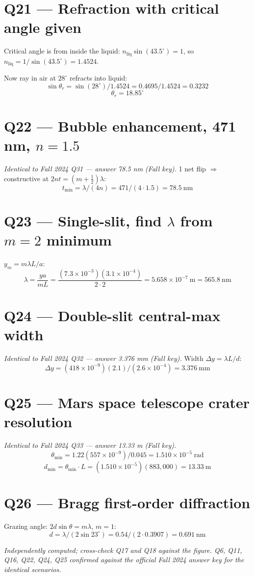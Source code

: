 \documentclass[11pt]{article}
\begin{document}
\section*{Q21 --- Refraction with critical angle given}
Critical angle is from inside the liquid: $n_{\text{liq}}\sin(43.5^\circ) = 1$, so $n_{\text{liq}} = 1/\sin(43.5^\circ) = 1.4524$.

Now ray in air at $28^\circ$ refracts into liquid:
\[ \sin\theta_r = \sin(28^\circ)/1.4524 = 0.4695/1.4524 = 0.3232 \]
\[ \theta_r = \boxed{18.85^\circ} \]

\section*{Q22 --- Bubble enhancement, 471 nm, $n=1.5$}
\emph{Identical to Fall 2024 Q31 --- answer 78.5 nm (Fall key).} 1 net flip $\Rightarrow$ constructive at $2nt=(m+\tfrac12)\lambda$:
\[ t_{\min} = \lambda/(4n) = 471/(4\cdot 1.5) = \boxed{78.5\ \text{nm}} \]

\section*{Q23 --- Single-slit, find $\lambda$ from $m=2$ minimum}
$y_m = m\lambda L/a$:
\[ \lambda = \frac{ya}{mL} = \frac{(7.3\times 10^{-3})(3.1\times 10^{-4})}{2\cdot 2} = 5.658\times 10^{-7}\ \text{m} = \boxed{565.8\ \text{nm}} \]

\section*{Q24 --- Double-slit central-max width}
\emph{Identical to Fall 2024 Q32 --- answer 3.376 mm (Fall key).} Width $\Delta y = \lambda L/d$:
\[ \Delta y = (418\times 10^{-9})(2.1)/(2.6\times 10^{-4}) = \boxed{3.376\ \text{mm}} \]

\section*{Q25 --- Mars space telescope crater resolution}
\emph{Identical to Fall 2024 Q33 --- answer 13.33 m (Fall key).}
\[ \theta_{\min} = 1.22(557\times 10^{-9})/0.045 = 1.510\times 10^{-5}\ \text{rad} \]
\[ d_{\min} = \theta_{\min}\cdot L = (1.510\times 10^{-5})(883{,}000) = \boxed{13.33\ \text{m}} \]

\section*{Q26 --- Bragg first-order diffraction}
Grazing angle: $2d\sin\theta = m\lambda$, $m=1$:
\[ d = \lambda/(2\sin 23^\circ) = 0.54/(2\cdot 0.3907) = \boxed{0.691\ \text{nm}} \]

\medskip
\noindent\emph{Independently computed; cross-check Q17 and Q18 against the figure. Q6, Q11, Q16, Q22, Q24, Q25 confirmed against the official Fall 2024 answer key for the identical scenarios.}
\end{document}
